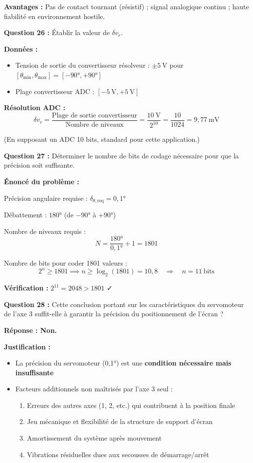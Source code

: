 \documentclass[12pt,a4paper,twoside]{article}
\begin{document}
\begin{correction}
  \textbf{Avantages :} Pas de contact tournant (résistif) ; signal analogique continu ; haute fiabilité en environnement hostile.

  \textbf{Question 26 :} Établir la valeur de $\delta v_r$.

  \textbf{Données :}
  \begin{itemize}
    \item Tension de sortie du convertisseur résolveur : $\pm 5~\text{V}$ pour $[\theta_{\min}, \theta_{\max}] = [-90°, +90°]$
    \item Plage convertisseur ADC : $[-5~\text{V}, +5~\text{V}]$
  \end{itemize}

  \textbf{Résolution ADC :}
  \[
    \delta v_r = \frac{\text{Plage de sortie convertisseur}}{\text{Nombre de niveaux}} = \frac{10~\text{V}}{2^{10}} = \frac{10}{1024} = 9,77~\text{mV}
  \]

  (En supposant un ADC 10 bits, standard pour cette application.)

  \textbf{Question 27 :} Déterminer le nombre de bits de codage nécessaire pour que la précision soit suffisante.

  \textbf{Énoncé du problème :}

  Précision angulaire requise : $\delta_{\theta,\text{req}} = 0,1°$

  Débattement : $180°$ (de $-90°$ à $+90°$)

  Nombre de niveaux requis :
  \[
    N = \frac{180°}{0,1°} + 1 = 1801
  \]

  Nombre de bits pour coder 1801 valeurs :
  \[
    2^{n} \geq 1801 \implies n \geq \log_2(1801) = 10,8 \quad \Rightarrow \quad n = 11~\text{bits}
  \]

  \textbf{Vérification :} $2^{11} = 2048 > 1801$ ✓

  \textbf{Question 28 :} Cette conclusion portant sur les caractéristiques du servomoteur de l'axe 3 suffit-elle à garantir la précision du positionnement de l'écran ?

  \textbf{Réponse : Non.}

  \textbf{Justification :}
  \begin{itemize}
    \item La précision du servomoteur (0,1°) est une \textbf{condition nécessaire mais insuffisante}
    \item Facteurs additionnels non maîtrisés par l'axe 3 seul :
    \begin{enumerate}
      \item Erreurs des autres axes (1, 2, etc.) qui contribuent à la position finale
      \item Jeu mécanique et flexibilité de la structure de support d'écran
      \item Amortissement du système après mouvement
      \item Vibrations résiduelles dues aux secousses de démarrage/arrêt
    \end{enumerate}
  \end{itemize}


\end{correction}
\end{document}
